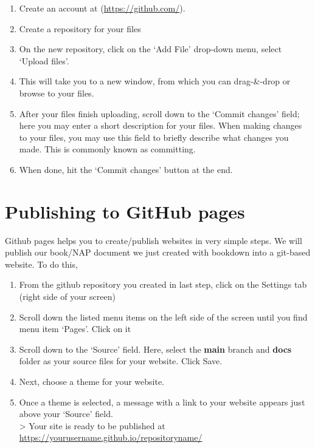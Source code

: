 \documentclass[
]{book}
\providecommand{\tightlist}{%
  \setlength{\itemsep}{0pt}\setlength{\parskip}{0pt}}
\begin{document}
\begin{enumerate}
\def\labelenumi{\arabic{enumi}.}
\tightlist
\item
  Create an account at (\url{https://github.com/}).
\item
  Create a repository for your files
\item
  On the new repository, click on the `Add File' drop-down menu, select `Upload files'.\\
\item
  This will take you to a new window, from which you can drag-\&-drop or browse to your files.
\item
  After your files finish uploading, scroll down to the `Commit changes' field; here you may enter a short description for your files. When making changes to your files, you may use this field to briefly describe what changes you made. This is commonly known as committing.\\
\item
  When done, hit the `Commit changes' button at the end.
\end{enumerate}

\hypertarget{publishing-to-github-pages}{%
\section{Publishing to GitHub pages}\label{publishing-to-github-pages}}

Github pages helps you to create/publish websites in very simple steps.
We will publish our book/NAP document we just created with bookdown into a git-based website.
To do this,

\begin{enumerate}
\def\labelenumi{\arabic{enumi}.}
\tightlist
\item
  From the github repository you created in last step, click on the Settings tab (right side of your screen)\\
\item
  Scroll down the listed menu items on the left side of the screen until you find menu item `Pages'. Click on it
\item
  Scroll down to the `Source' field. Here, select the \textbf{main} branch and \textbf{docs} folder as your source files for your website. Click Save.\\
\item
  Next, choose a theme for your website.\\
\item
  Once a theme is selected, a message with a link to your website appears just above your `Source' field.\\
  \textgreater{} Your site is ready to be published at \url{https://yourusername.github.io/repositoryname/}
\end{enumerate}
\end{document}
